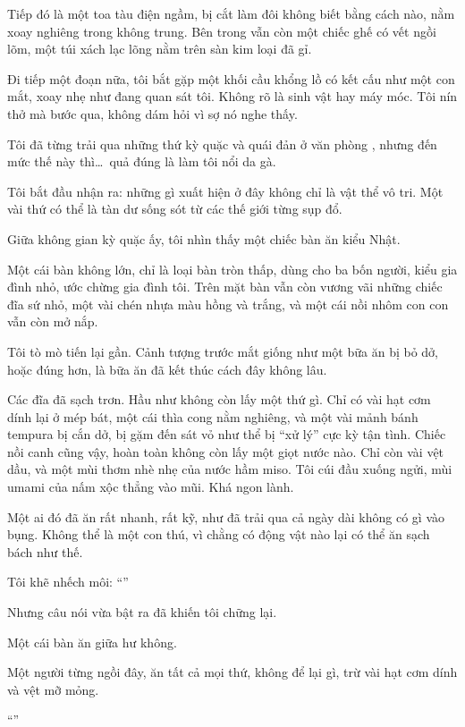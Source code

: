 \documentclass[../main.tex]{subfiles}
\begin{document}
Tiếp đó là một toa tàu điện ngầm, bị cắt làm đôi không biết bằng cách nào, nằm xoay nghiêng trong không trung. Bên trong vẫn còn một chiếc ghế có vết ngồi lõm, một túi xách lạc lõng nằm trên sàn kim loại đã gỉ.

Đi tiếp một đoạn nữa, tôi bắt gặp một khối cầu khổng lồ có kết cấu như một con mắt, xoay nhẹ như đang quan sát tôi. Không rõ là sinh vật hay máy móc. Tôi nín thở mà bước qua, không dám hỏi vì sợ nó nghe thấy.

Tôi đã từng trải qua những thứ kỳ quặc và quái đản ở văn phòng \hll, nhưng đến mức thế này thì\dots\ quả đúng là làm tôi nổi da gà.

Tôi bắt đầu nhận ra: những gì xuất hiện ở đây không chỉ là vật thể vô tri. Một vài thứ có thể là tàn dư sống sót từ các thế giới từng sụp đổ.

Giữa không gian kỳ quặc ấy, tôi nhìn thấy một chiếc bàn ăn kiểu Nhật.

Một cái bàn không lớn, chỉ là loại bàn tròn thấp, dùng cho ba bốn người, kiểu gia đình nhỏ, ước chừng gia đình tôi. Trên mặt bàn vẫn còn vương vãi những chiếc đĩa sứ nhỏ, một vài chén nhựa màu hồng và trắng, và một cái nồi nhôm con con vẫn còn mở nắp.

Tôi tò mò tiến lại gần. Cảnh tượng trước mắt giống như một bữa ăn bị bỏ dở, hoặc đúng hơn, là bữa ăn đã kết thúc cách đây không lâu.

Các đĩa đã sạch trơn. Hầu như không còn lấy một thứ gì. Chỉ có vài hạt cơm dính lại ở mép bát, một cái thìa cong nằm nghiêng, và một vài mảnh bánh tempura bị cắn dở, bị gặm đến sát vỏ như thể bị ``xử lý'' cực kỳ tận tình. Chiếc nồi canh cũng vậy, hoàn toàn không còn lấy một giọt nước nào. Chỉ còn vài vệt dầu, và một mùi thơm nhè nhẹ của nước hầm miso. Tôi cúi đầu xuống ngửi, mùi umami của nấm xộc thẳng vào mũi. Khá ngon lành.

Một ai đó đã ăn rất nhanh, rất kỹ, như đã trải qua cả ngày dài không có gì vào bụng. Không thể là một con thú, vì chằng có động vật nào lại có thể ăn sạch bách như thế.

Tôi khẽ nhếch môi: ``''

Nhưng câu nói vừa bật ra đã khiến tôi chững lại.

Một cái bàn ăn giữa hư không.

Một người từng ngồi đây, ăn tất cả mọi thứ, không để lại gì, trừ vài hạt cơm dính và vệt mỡ mỏng.

``''
\end{document}
